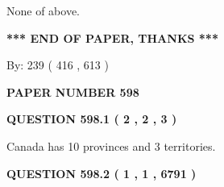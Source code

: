 \documentclass[12pt]{article}
\begin{document}
 
\noindent{}
 
 
 None of above.
 
 
 
 
   
   
 \vspace{0.2in}
 
   
   
   
   
\vspace{1.0in} 
{\textbf{\large{ *** END OF PAPER, THANKS *** }}} 
   
   
\hspace{1.0in} By: 
 239 ( 416 ,  613 )
   
   
   
   
\newpage 
\setcounter{page}{ 
   598001 } 
   
   
   
   
 {\textbf{ \Large{ PAPER NUMBER  598  }}}
   
   
\vspace{0.2in}
   
   
   
   
   
   
 \vspace{0.2in}
 
 
 
 
   
   
  
\vspace{0.2in}
  
{\textbf{\Large{QUESTION
598.1 
 ( 2 , 2 , 3 )
}}}
  
  
 
 
\noindent{}
 
 
Canada has 10  provinces and 3 territories.
 
 
 
 
  
\vspace{0.2in}
  
{\textbf{\Large{QUESTION
598.2 
 ( 1 , 1 , 6791 )
}}}
  
  
 
 
\noindent{}
\end{document}
